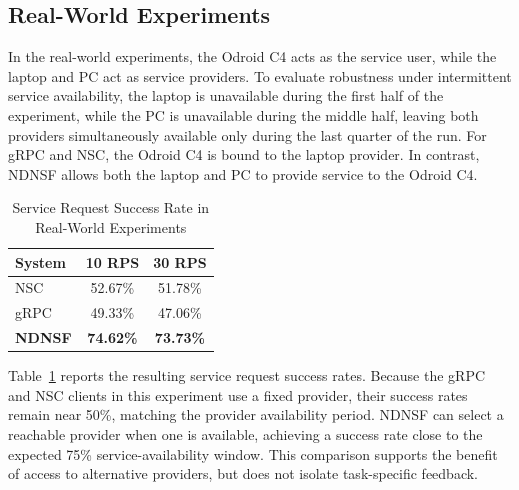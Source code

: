 \subsection{Real-World Experiments}

In the real-world experiments, the Odroid C4 acts as the service user, while the laptop and PC act as service providers. To evaluate robustness under intermittent service availability, the laptop is unavailable during the first half of the experiment, while the PC is unavailable during the middle half, leaving both providers simultaneously available only during the last quarter of the run. For gRPC and NSC, the Odroid C4 is bound to the laptop provider. In contrast, NDNSF allows both the laptop and PC to provide service to the Odroid C4.

\begin{table}[!ht]
  \centering
  \caption{Service Request Success Rate in Real-World Experiments}
  \label{tab:real_machine_availability}

  \small
  \setlength{\tabcolsep}{9pt}

  \begin{tabular}{lcc}
    \toprule
    System & 10 RPS & 30 RPS \\
    \midrule
    NSC   & 52.67\% & 51.78\% \\
    gRPC  & 49.33\% & 47.06\% \\
    \textbf{NDNSF} & \textbf{74.62\%} & \textbf{73.73\%} \\
    \bottomrule
  \end{tabular}
  \vspace{-3mm}
\end{table}

Table~\ref{tab:real_machine_availability} reports the resulting service request success rates. Because the gRPC and NSC clients in this experiment use a fixed provider, their success rates remain near 50\%, matching the provider availability period. NDNSF can select a reachable provider when one is available, achieving a success rate close to the expected 75\% service-availability window. This comparison supports the benefit of access to alternative providers, but does not isolate task-specific feedback.
